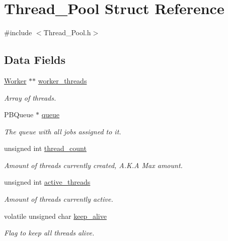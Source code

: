 \hypertarget{struct_thread___pool}{}\section{Thread\+\_\+\+Pool Struct Reference}
\label{struct_thread___pool}


{\ttfamily \#include $<$Thread\+\_\+\+Pool.\+h$>$}

\subsection*{Data Fields}
\begin{DoxyCompactItemize}
\item 
\hyperlink{struct_worker}{Worker} $\ast$$\ast$ \hyperlink{struct_thread___pool_afc031365b3e1598d6e6c422c03722120}{worker\+\_\+threads}
\begin{DoxyCompactList}\small\item\em Array of threads. \end{DoxyCompactList}\item 
P\+B\+Queue $\ast$ \hyperlink{struct_thread___pool_a6eb567d0cc8a6098553d1f9d81ae053c}{queue}
\begin{DoxyCompactList}\small\item\em The queue with all jobs assigned to it. \end{DoxyCompactList}\item 
unsigned int \hyperlink{struct_thread___pool_a2a469ce06ddf913155542574fd51e40e}{thread\+\_\+count}
\begin{DoxyCompactList}\small\item\em Amount of threads currently created, A.\+K.\+A Max amount. \end{DoxyCompactList}\item 
unsigned int \hyperlink{struct_thread___pool_af185a17406e07af53296afac2f2abd2e}{active\+\_\+threads}
\begin{DoxyCompactList}\small\item\em Amount of threads currently active. \end{DoxyCompactList}\item 
volatile unsigned char \hyperlink{struct_thread___pool_ac24a1c7364475077551efc2e48bda9d0}{keep\+\_\+alive}
\begin{DoxyCompactList}\small\item\em Flag to keep all threads alive. \end{DoxyCompactList}\item 
$$
\end{DoxyCompactItemize}
